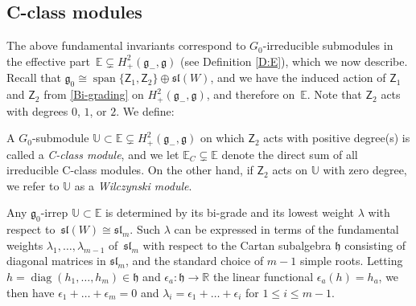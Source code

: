 \documentclass[pdftex]{sigma}%
\DeclareMathOperator{\sn}{span}
\DeclareMathOperator{\diag}{diag}
\newcommand{\g}{\mathfrak{g}}
\newcommand{\fh}{\mathfrak{h}}
\newcommand\fsl{\mathfrak{sl}}
\newcommand{\R}{\mathbb{R}}
\newcommand\bbE{\mathbb{E}}
\newcommand\bbU{\mathbb{U}}
\newcommand\sfZ{\mathsf{Z}}
\numberwithin{equation}{section}
\begin{document}
 \subsection{C-class modules} \label{S:CM}

 The above fundamental invariants correspond to $G_0$-irreducible submodules in the effective part~$\bbE \subsetneq H^2_+(\g_-,\g)$ (see Definition \ref{D:E}), which we now describe.
Recall that $\g_0 \cong \sn \{\sfZ_1, \sfZ_2\} \oplus \fsl(W)$, and we have the induced action of $\sfZ_1$ and $\sfZ_2$ from \eqref{Bi-grading} on $H^2_+(\g_-,\g)$, and therefore on~$\bbE$. Note that $\sfZ_2$ acts with degrees $0$, $1$, or $2$. We define:

\begin{Definition}\label{D:C-classM}
A $G_0$-submodule $\bbU \subset \bbE \subsetneq H^2_+(\g_-,\g)$ on which $\sfZ_2$ acts with positive degree(s) is called a {\em C-class module}, and we let $\bbE_C \subsetneq \bbE$ denote the direct sum of all irreducible C-class modules. On the other hand, if $\sfZ_2$ acts on $\bbU$ with zero degree, we refer to $\bbU$ as a {\em Wilczynski module}.
\end{Definition}

Any $\g_{0}$-irrep $\bbU \subset \bbE$ is determined by its bi-grade and its lowest weight $\lambda$ with respect to~$\fsl(W) \cong \fsl_m$. Such $\lambda$ can be expressed in terms of the fundamental weights $\lambda_1, \dots, \lambda_{m-1}$ of~$\fsl_m$ with respect to the Cartan subalgebra $\fh$ consisting of diagonal matrices in $\fsl_m$, and the standard choice of $m-1$ simple roots. Letting $h = \diag (h_1, \dots,h_m) \in \fh$ and $\epsilon_a\colon \fh \to \R$ the linear functional $\epsilon_a(h) = h_a$, we then have $\epsilon_1 +\dots+ \epsilon_m = 0$ and $\lambda_i = \epsilon_1 + \dots + \epsilon_i$ for $1 \leq i \leq m-1$.
\end{document}
